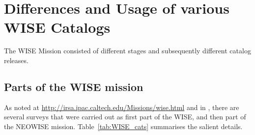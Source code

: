 \documentclass[usenatbib]{mn2e}
\begin{document}
\appendix

\section{Differences and Usage of various WISE Catalogs}
The WISE Mission consisted of different stages and subsequently different catalog releases. 

\subsection{Parts of the WISE mission}
As noted at
\href{http://irsa.ipac.caltech.edu/Missions/wise.html}{http://irsa.ipac.caltech.edu/Missions/wise.html}
and in \cite{Meisner16}, there are several surveys that were carried
out as first part of the WISE, and then part of the NEOWISE mission.
Table~\ref{tab:WISE_cats} summarises the salient details. 
\end{document}
